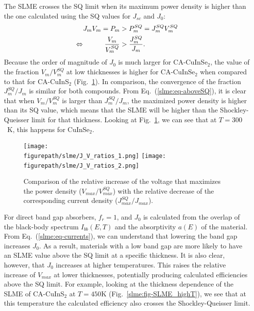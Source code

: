 \begin{refsection}
The SLME crosses the SQ limit when its maximum power density is higher than 
the one calculated using the SQ values for $J_{sc}$ and $J_0$: 
\begin{equation} \label{slme:eq-aboveSQ} 
\begin{aligned} 
J_m V_m = P_m &> P_m^{SQ} = J_m^{SQ} V_m^{SQ} \\ 
\Leftrightarrow \hspace{0.4in}\frac{V_m}{V_m^{SQ}} &> \frac{J_m^{SQ}}{J_m}. 
\end{aligned} 
\end{equation} 
Because the order of magnitude of $J_0$ is much larger for 
\mbox{CA-CuInSe$_2$}, the value of the fraction $V_m/V_m^{SQ}$ at low 
thicknesses is higher for \mbox{CA-CuInSe$_2$} when compared to that for 
\mbox{CA-CuInS$_2$} (Fig.~\ref{slme:fig-VJcomp}). In comparison, the 
convergence of the fraction $J_m^{SQ}/J_m$ is similar for both compounds. From 
Eq.~(\ref{slme:eq-aboveSQ}), it is clear that when $V_m/V_m^{SQ}$ is larger 
than $J_m^{SQ}/J_m$, the maximized power density is higher than its SQ value, 
which means that the SLME will be higher than the Shockley-Queisser limit for 
that thickness. Looking at Fig.~\ref{slme:fig-VJcomp}, we can see that at 
$T=300$~\si{\kelvin}, this happens for CuInSe$_2$. 
 
\begin{figure}[ht] 
	\centering 
		\texttt{[image: \\figurepath/slme/J\_V\_ratios\_1.png]} 
		\texttt{[image: \\figurepath/slme/J\_V\_ratios\_2.png]} 
	\caption{Comparison of the relative increase of the voltage that maximizes 
the power density ($V_{max}/V_{max}^{SQ}$) with the relative decrease of the 
corresponding current density ($J_{max}^{SQ}/J_{max}$).} 
	\label{slme:fig-VJcomp} 
\end{figure} 
 
For direct band gap absorbers, $f_r = 1$, and $J_0$ is calculated from the 
overlap of the black-body spectrum $I_{bb}(E,T)$ and the absorptivity $a(E)$ 
of the material. From Eq.~(\ref{slme:eq-currents}), we can understand that 
lowering the band gap increases $J_0$. As a result, materials with a low band 
gap are more likely to have an SLME value above the SQ limit at a specific 
thickness. It is also clear, however, that $J_0$ increases at higher 
temperatures. This raises the relative increase of $V_{max}$ at lower 
thicknesses, potentially producing calculated efficiencies above the SQ limit. 
For example, looking at the thickness dependence of the SLME of CA-CuInS$_2$ 
at $T=450\si{\kelvin}$ (Fig.~\ref{slme:fig-SLME_highT}), we see that at this 
temperature the calculated efficiency also crosses the Shockley-Queisser 
limit.  
 

\end{refsection}
